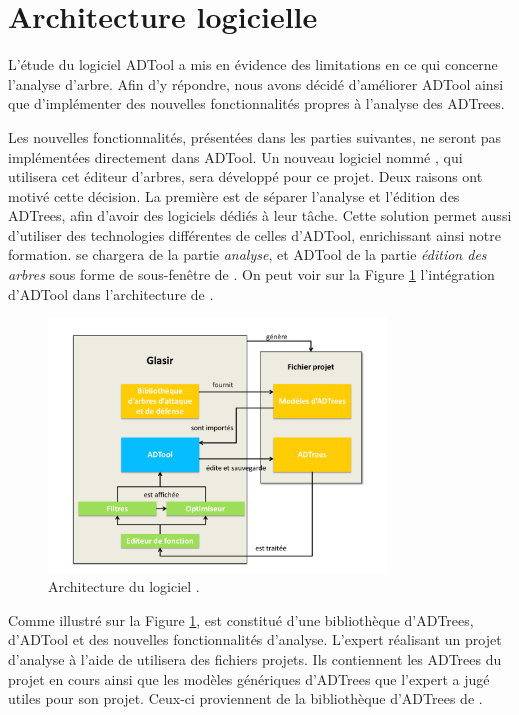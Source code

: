 \section{Architecture logicielle}
	\label{section:archi}

L'étude du logiciel ADTool a mis en évidence des limitations en ce qui concerne l'analyse d'arbre. Afin d'y répondre, nous avons décidé d'améliorer ADTool ainsi que d'implémenter des nouvelles fonctionnalités propres à l'analyse des ADTrees.

Les nouvelles fonctionnalités, présentées dans les parties suivantes, ne seront pas implémentées directement dans ADTool. Un nouveau logiciel nommé \glasir{}, qui utilisera cet éditeur d'arbres, sera développé pour ce projet. Deux raisons ont motivé cette décision. 
La première est de séparer l'analyse et l'édition des ADTrees, afin d'avoir des logiciels dédiés à leur tâche. Cette solution permet aussi d'utiliser des technologies différentes de celles d'ADTool, enrichissant ainsi notre formation. \glasir{} se chargera de la partie \textit{analyse}, et ADTool de la partie \textit{édition des arbres} sous forme de sous-fenêtre de \glasir{}. On peut voir sur la {\sc Figure} \ref{fig:architecture_Glasir} l'intégration d'ADTool dans l'architecture de \glasir{}.

	\begin{figure}[h!]
		\centering
			\includegraphics[width=0.8\textwidth]{figure/archiGlasir.pdf}
		\caption{Architecture du logiciel \glasir{}.}
		\label{fig:architecture_Glasir}
	\end{figure}

Comme illustré sur la {\sc Figure} \ref{fig:architecture_Glasir}, \glasir{} est constitué d'une bibliothèque d'ADTrees, d'ADTool et des nouvelles fonctionnalités d'analyse. L'expert réalisant un projet d'analyse à l'aide de \glasir{} utilisera des fichiers projets. Ils contiennent les ADTrees du projet en cours ainsi que les modèles génériques d'ADTrees que l'expert a jugé utiles pour son projet. Ceux-ci proviennent de la bibliothèque d'ADTrees de \glasir{}.
	
